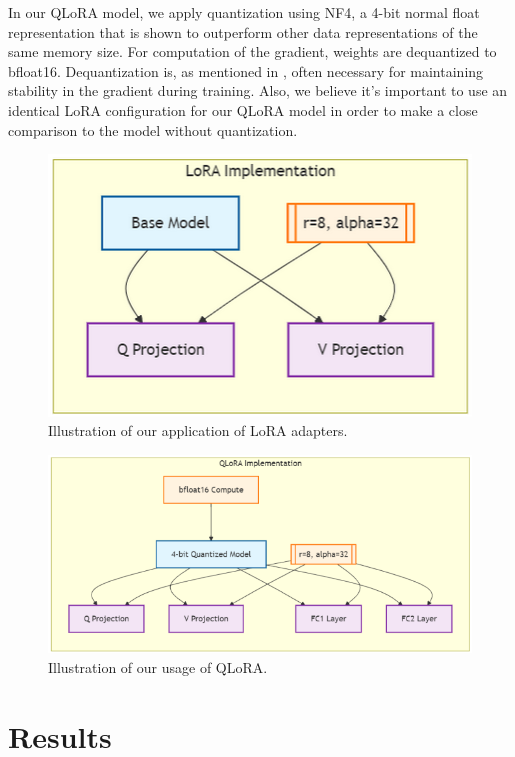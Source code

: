 \documentclass[11pt]{article}
\begin{document}
In our QLoRA model, we apply quantization using NF4, a 4-bit normal float representation that is shown to outperform other data representations of the same memory size. For computation of the gradient, weights are dequantized to bfloat16. Dequantization is, as mentioned in \cite{dettmers2023qlora}, often necessary for maintaining stability in the gradient during training. Also, we believe it's important to use an identical LoRA configuration for our QLoRA model in order to make a close comparison to the model without quantization.

\begin{figure}[h]
	\includegraphics[width=\columnwidth]{lora_implementation.png}
	\centering
	\caption{Illustration of our application of LoRA adapters.}
	\label{fig:lora_impl}
\end{figure}

\begin{figure}[h]
	\includegraphics[width=5in]{qlora_implementation.png}
	\centering
	\caption{Illustration of our usage of QLoRA.}
	\label{fig:qlora_impl}
\end{figure}

\section{Results}
\end{document}
